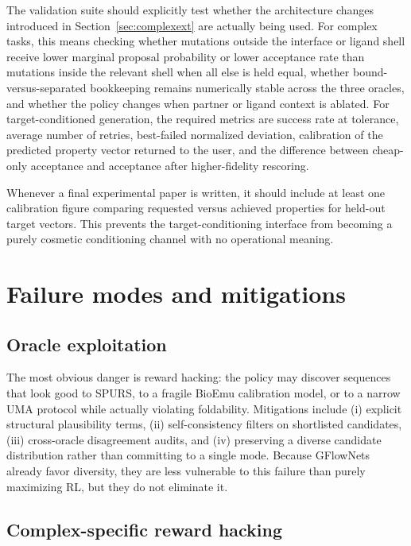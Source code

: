 \documentclass[11pt]{article}
\begin{document}
The validation suite should explicitly test whether the architecture changes introduced in Section~\ref{sec:complexext} are actually being used. For complex tasks, this means checking whether mutations outside the interface or ligand shell receive lower marginal proposal probability or lower acceptance rate than mutations inside the relevant shell when all else is held equal, whether bound-versus-separated bookkeeping remains numerically stable across the three oracles, and whether the policy changes when partner or ligand context is ablated. For target-conditioned generation, the required metrics are success rate at tolerance, average number of retries, best-failed normalized deviation, calibration of the predicted property vector returned to the user, and the difference between cheap-only acceptance and acceptance after higher-fidelity rescoring.

Whenever a final experimental paper is written, it should include at least one calibration figure comparing requested versus achieved properties for held-out target vectors. This prevents the target-conditioning interface from becoming a purely cosmetic conditioning channel with no operational meaning.


\section{Failure modes and mitigations}
\label{sec:failure}

\subsection{Oracle exploitation}

The most obvious danger is reward hacking: the policy may discover sequences that look good to SPURS, to a fragile BioEmu calibration model, or to a narrow UMA protocol while actually violating foldability. Mitigations include (i) explicit structural plausibility terms, (ii) self-consistency filters on shortlisted candidates, (iii) cross-oracle disagreement audits, and (iv) preserving a diverse candidate distribution rather than committing to a single mode. Because GFlowNets already favor diversity, they are less vulnerable to this failure than purely maximizing RL, but they do not eliminate it.



\subsection{Complex-specific reward hacking}
\end{document}
